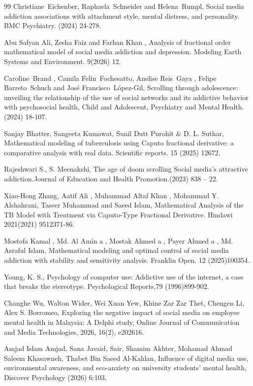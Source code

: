 \documentclass[10pt]{NSP1}
\numberwithin{equation}{section}
\begin{document}
\begin{thebibliography}{99}
Christiane Eichenber, Raphaela Schneider and Helena Rumpl, Social media addiction associations with attachment style, mental distress, and personality. BMC Psychiatry. (2024) 24-278.

Abu Safyan Ali, Zesha Faiz and Farhan Khan , Analysis of fractional order mathematical model of social media addiction and depression. Modeling Earth Systems and Environment. 9(2026) 12.

Caroline Brand , Camila Felin Fochesatto, Anelise Reis Gaya , Felipe Barreto Schuch and José Francisco López-Gil, Scrolling through adolescence: unveiling the relationship of the use of social networks and its addictive behavior with psychosocial health, Child and Adolescent, Psychiatry and Mental Health. (2024) 18-107.

Sanjay Bhatter, Sangeeta Kumawat, Sunil Dutt Purohit \& D. L. Suthar, Mathematical modeling of tuberculosis using Caputo fractional derivative: a comparative analysis with real data. Scientific reports. 15 (2025) 12672.

Rajeshwari S., S. Meenakshi, The age of doom scrolling Social media’s attractive addiction.Journal of Education and Health Promotion.(2023) 838 – 22.

Xiao-Hong Zhang, Aatif Ali , Muhammad Altaf Khan , Mohammad Y. Alshahrani, Taseer Muhammad and Saeed Islam, Mathematical Analysis of the TB Model with Treatment via Caputo-Type Fractional Derivative. Hindawi 2021(2021) 9512371-86.

Mostofa Kamal , Md. Al Amin a , Mostak Ahmed a , Payer Ahmed a , Md. Asraful Islam, Mathematical modeling and optimal control of social media addiction with stability and sensitivity analysis. Franklin Open. 12 (2025)100354.

Young, K. S., Psychology of computer use: Addictive use of the internet, a case that breaks the stereotype. Psychological Reports,79 (1996)899-902.

Changhe Wu, Walton Wider, Wei Xuan Yew, Khine Zar Zar Thet, Chengen Li, Alex S. Borromeo, Exploring the negative impact of social media on employee mental health in Malaysia: A Delphi study, Online Journal of Communication and Media Technologies, 2026, 16(2), e202616.

Amjad Islam Amjad, Sana Javaid, Sair, Shamim Akhter, Mohamad Ahmad Saleem Khasawneh, Thabet Bin Saeed Al-Kahlan, Influence of digital media use, environmental awareness, and eco-anxiety on university students’ mental health, Discover Psychology (2026) 6:103,


\end{thebibliography}
\end{document}
